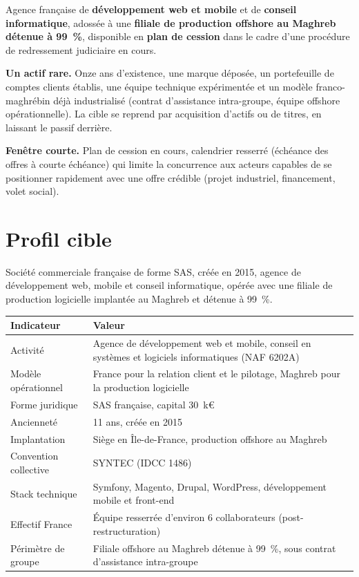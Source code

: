 \documentclass[11pt,a4paper]{article}
\begin{document}
Agence française de \textbf{développement web et mobile} et de \textbf{conseil informatique}, adossée à une \textbf{filiale de production offshore au Maghreb détenue à 99~\%}, disponible en \textbf{plan de cession} dans le cadre d'une procédure de redressement judiciaire en cours.

\textbf{Un actif rare.} Onze ans d'existence, une marque déposée, un portefeuille de comptes clients établis, une équipe technique expérimentée et un modèle franco-maghrébin déjà industrialisé (contrat d'assistance intra-groupe, équipe offshore opérationnelle). La cible se reprend par acquisition d'actifs ou de titres, en laissant le passif derrière.

\textbf{Fenêtre courte.} Plan de cession en cours, calendrier resserré (échéance des offres à courte échéance) qui limite la concurrence aux acteurs capables de se positionner rapidement avec une offre crédible (projet industriel, financement, volet social).

\section{Profil cible}

Société commerciale française de forme SAS, créée en 2015, agence de développement web, mobile et conseil informatique, opérée avec une filiale de production logicielle implantée au Maghreb et détenue à 99~\%.

\begin{longtable}{L{4.5cm}L{10.5cm}}
\toprule
\textbf{Indicateur} & \textbf{Valeur} \\
\midrule
\endhead
Activité & Agence de développement web et mobile, conseil en systèmes et logiciels informatiques (NAF 6202A) \\
Modèle opérationnel & France pour la relation client et le pilotage, Maghreb pour la production logicielle \\
Forme juridique & SAS française, capital 30~k\euro{} \\
Ancienneté & 11 ans, créée en 2015 \\
Implantation & Siège en Île-de-France, production offshore au Maghreb \\
Convention collective & SYNTEC (IDCC 1486) \\
Stack technique & Symfony, Magento, Drupal, WordPress, développement mobile et front-end \\
Effectif France & Équipe resserrée d'environ 6 collaborateurs (post-restructuration) \\
Périmètre de groupe & Filiale offshore au Maghreb détenue à 99~\%, sous contrat d'assistance intra-groupe \\
\bottomrule
\end{longtable}
\end{document}
